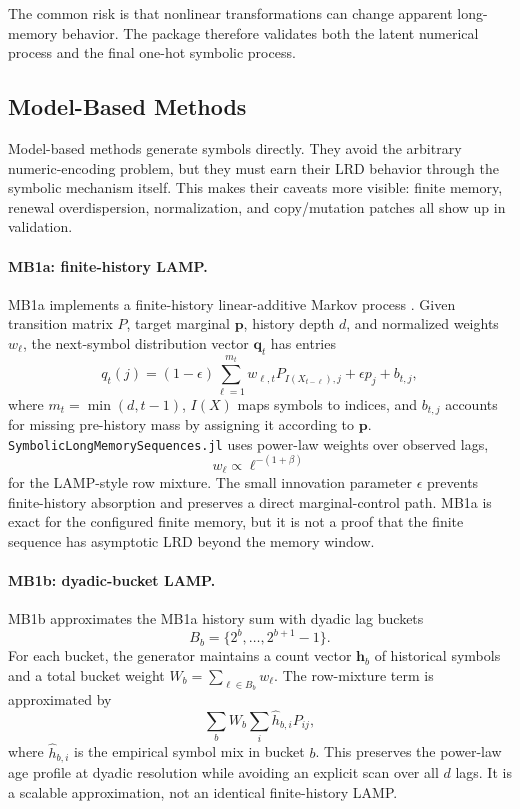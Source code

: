 \documentclass[journal]{IEEEtran}
\newcommand{\pkg}[1]{\texttt{#1}}
\newcommand{\vect}[1]{\boldsymbol{#1}}
\newcommand{\sfive}{\pkg{SymbolicLongMemorySequences.jl}}
\begin{document}
The common risk is that nonlinear transformations can change apparent
long-memory behavior. The package therefore validates both the latent numerical
process and the final one-hot symbolic process.

\subsection{Model-Based Methods}

Model-based methods generate symbols directly.  They avoid the arbitrary
numeric-encoding problem, but they must earn their LRD behavior through the
symbolic mechanism itself.  This makes their caveats more visible: finite memory,
renewal overdispersion, normalization, and copy/mutation patches all show up in
validation.

\paragraph{MB1a: finite-history LAMP.}
MB1a implements a finite-history linear-additive Markov process
\cite{kumar2017_linear}. Given transition matrix $P$, target marginal \(\vect{p}\),
history depth $d$, and normalized weights $w_\ell$, the next-symbol
distribution vector \(\vect{q}_t\) has entries
\begin{equation}
  q_t(j) = (1-\epsilon)\sum_{\ell=1}^{m_t} w_{\ell,t}
             P_{I(X_{t-\ell}),j}
          + \epsilon p_j + b_{t,j},
\end{equation}
where $m_t=\min(d,t-1)$, $I(X)$ maps symbols to indices, and $b_{t,j}$ accounts
for missing pre-history mass by assigning it according to \(\vect{p}\). \sfive{} uses
power-law weights over observed lags,
\begin{equation}
  w_\ell \propto \ell^{-(1+\beta)}
\end{equation}
for the LAMP-style row mixture. The small innovation parameter $\epsilon$
prevents finite-history absorption and preserves a direct marginal-control
path. MB1a is exact for the configured finite memory, but it is not a proof that
the finite sequence has asymptotic LRD beyond the memory window.

\paragraph{MB1b: dyadic-bucket LAMP.}
MB1b approximates the MB1a history sum with dyadic lag buckets
\begin{equation}
  B_b = \{2^b,\ldots,2^{b+1}-1\}.
\end{equation}
For each bucket, the generator maintains a count vector \(\vect{h}_b\) of
historical symbols
and a total bucket weight $W_b=\sum_{\ell\in B_b} w_\ell$. The row-mixture term
is approximated by
\begin{equation}
  \sum_b W_b \sum_i \hat h_{b,i} P_{ij},
\end{equation}
where $\hat h_{b,i}$ is the empirical symbol mix in bucket $b$. This preserves
the power-law age profile at dyadic resolution while avoiding an explicit scan
over all $d$ lags. It is a scalable approximation, not an identical
finite-history LAMP.
\end{document}
